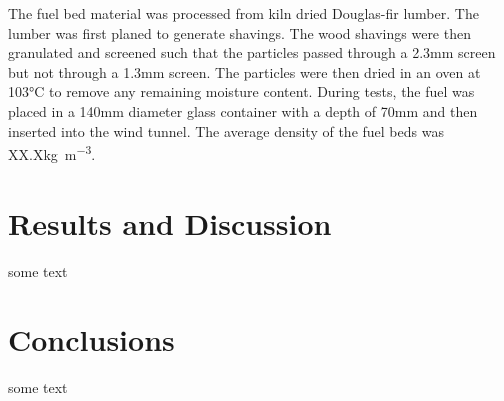     The fuel bed material was processed from kiln dried Douglas-fir lumber. The lumber was first planed to generate shavings. The wood shavings were then granulated and screened such that the particles passed through a 2.3\si{\milli\meter} screen but not through a 1.3\si{\milli\meter} screen. The particles were then dried in an oven at 103\si{\celsius} to remove any remaining moisture content. During tests, the fuel was placed in a 140\si{\milli\meter} diameter glass container with a depth of 70\si{\milli\meter} and then inserted into the wind tunnel. The average density of the fuel beds was XX.X\si{\kilo\gram\per\cubic\meter}.
    
    

\section{Results and Discussion}
    some text
\section{Conclusions}
    some text